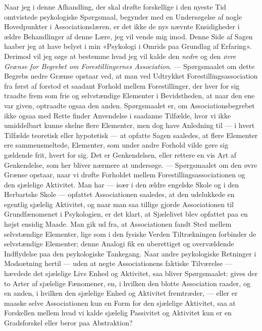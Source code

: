 \documentclass[12pt,a4paper,openany]{book}
\newcommand{\opage}[1]{\marginnote{\footnotesize\textit{[#1]}}}
\begin{document}
Naar jeg i denne Afhandling, der skal drøfte forskellige i den nyeste Tid
omtvistede psykologiske Spørgsmaal, begynder med en Undersøgelse af nogle
Hovedpunkter i Associationslæren, er det ikke de nys nævnte Ensidigheder i
ældre Behandlinger af denne Lære, jeg vil vende mig imod. Denne Side af Sagen
haaber jeg at have belyst i min «Psykologi i Omrids paa Grundlag af Erfaring».
Derimod vil jeg søge at bestemme
\setcounter{footnote}{0}%
\opage{6}hvad jeg vil kalde den \emph{nedre} og den \emph{øvre Grænse for
Begrebet om Forestillingernes Association}. --- Spørgsmaalet om dette Begrebs
nedre Grænse opstaar ved, at man ved Udtrykket Forestillingsassociation fra
først af forstod et saadant Forhold mellem Forestillinger, der hver for sig
traadte frem som frie og selvstændige Elementer i Bevidstheden, at naar den ene
var given, optraadte ogsaa den anden. Spørgsmaalet er, om Associationsbegrebet
ikke ogsaa med Rette finder Anvendelse i saadanne Tilfælde, hvor vi ikke
umiddelbart kunne skelne flere Elementer, men dog have Anledning til --- i
hvert Tilfælde teoretisk eller hypotetisk --- at opfatte Sagen saaledes, at
flere Elementer ere sammensmeltede, Elementer, som under andre Forhold vilde
gøre sig gældende frit, hvert for sig. Det er Genkendelsen, eller rettere en
vis Art af Genkendelse, som her bliver nærmere at undersøge. --- Spørgsmaalet
om den øvre Grænse opstaar, naar vi drøfte Forholdet mellem
Forestillingsassociationen og den sjælelige Aktivitet. Man har --- især i den
ældre engelske Skole og i den Herbartske Skole --- opfattet Associationen
saaledes, at den udelukkede en egentlig sjælelig Aktivitet, og naar man saa
tillige gjorde Associationen til Grundfænomenet i Psykologien, er det klart, at
Sjælelivet blev opfattet paa en højst ensidig Maade. Man gik ud fra, at
Associationen fandt Sted mellem selvstændige Elementer, lige som i den fysiske
Verden Tiltrækningen forbinder de selvstændige Elementer; denne Analogi fik en
uberettiget og overvældende Indflydelse paa den psykologiske Tankegang. Naar
andre psykologiske Retninger i Modsætning hertil --- uden at negte
Associationens faktiske Tilværelse --- hævdede det sjælelige Livs Enhed og
Aktivitet, saa bliver Spørgsmaalet: gives der to Arter af sjælelige Fænomener,
en, i hvilken den blotte Association raader, og en anden, i hvilken den
sjælelige Enhed og Aktivitet fremtræder, --- eller er maaske selve
Associationen kun en Form for den sjælelige Aktivitet, saa at Forskellen mellem
hvad vi kalde sjælelig Passivitet og Aktivitet kun er en Gradsforskel eller
beror paa Abstraktion?
\end{document}
